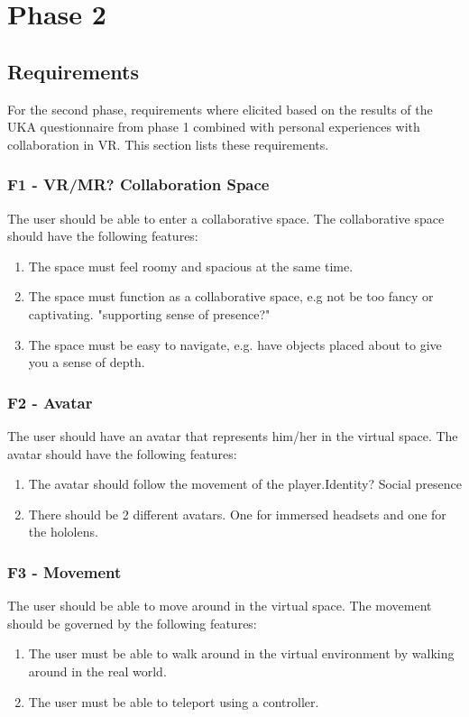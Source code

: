 \chapter{Phase 2}
    \section{Requirements}
    For the second phase, requirements where elicited based on the results of the UKA questionnaire from phase 1 combined with personal experiences with collaboration in VR. This section lists these requirements.
    
    
        \subsection{F1 - VR/MR? Collaboration Space}
        The user should be able to enter a collaborative space. The collaborative space should have the following features:
        \begin{enumerate}
            \item The space must feel roomy and spacious at the same time.
            \item The space must function as a collaborative space, e.g not be too fancy or captivating.  "supporting sense of presence?"
            \item The space must be easy to navigate, e.g. have objects placed about to give you a sense of depth.
        \end{enumerate}
        
        \subsection{F2 - Avatar}
        The user should have an avatar that represents him/her in the virtual space. The avatar should have the following features:
        \begin{enumerate}
            \item The avatar should follow the movement of the player.Identity? Social presence
            \item There should be 2 different avatars. One for immersed headsets and one for the hololens.
        \end{enumerate}
        
        \subsection{F3 - Movement}
        The user should be able to move around in the virtual space. The movement should be governed by the following features:
        \begin{enumerate}
            \item The user must be able to walk around in the virtual environment by walking around in the real world.
            \item The user must be able to teleport using a controller.
        \end{enumerate}
        
